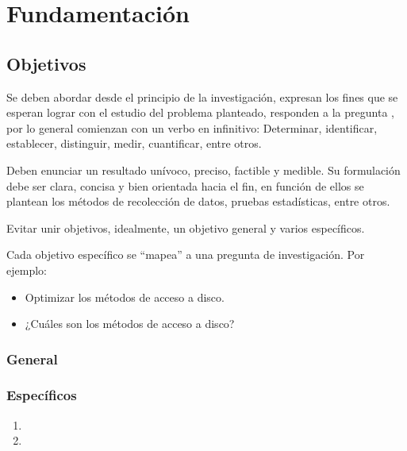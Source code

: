 \documentclass[12pt]{report}
\begin{document}
\chapter{Fundamentación}

\section{Objetivos}\label{objetivos}

Se deben abordar desde el principio de la investigación, expresan los fines que se esperan lograr con el estudio del problema planteado, responden a la pregunta , por lo general comienzan con un verbo en infinitivo: Determinar, identificar, establecer, distinguir, medir, cuantificar, entre otros.

Deben enunciar un resultado unívoco, preciso, factible y medible. Su formulación debe ser clara, concisa y bien orientada hacia el fin, en función de ellos se plantean los métodos de recolección de datos, pruebas estadísticas, entre otros.

Evitar unir objetivos, idealmente, un objetivo general y varios específicos.

Cada objetivo específico se ``mapea'' a una pregunta de investigación.
Por ejemplo:
  \begin{itemize}
  \item \textbf{} Optimizar los métodos de acceso a disco.
  \item \textbf{} ¿Cuáles son los métodos de acceso a disco?
\end{itemize}
\subsection{General}
\lipsum[1]%

\subsection{Específicos}
\begin{enumerate}\justifying
  \item \lipsum[1]%
 
  \item \lipsum[1]%

\end{enumerate}
\end{document}
